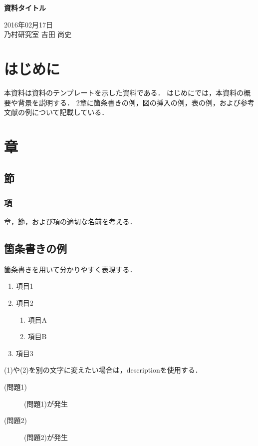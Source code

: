 \documentclass[fleqn, 14pt]{sty/extarticlej}
\begin{document}
\begin{center}
{\Large {\bf 資料タイトル}}

\end{center}
\begin{flushright}
2016年02月17日\\

乃村研究室 吉田 尚史
\end{flushright}
\section{はじめに}
本資料は資料のテンプレートを示した資料である．
はじめにでは，本資料の概要や背景を説明する．
2章に箇条書きの例，図の挿入の例，表の例，および参考文献の例について記載している．

\section{章}
\subsection{節}
\subsubsection{項}

章，節，および項の適切な名前を考える．

\subsection{箇条書きの例}
箇条書きを用いて分かりやすく表現する．
\begin{enumerate}
\item 項目1
\item 項目2
  \begin{enumerate}
  \item 項目A
  \item 項目B
  \end{enumerate}
\item 項目3
\end{enumerate}

(1)や(2)を別の文字に変えたい場合は，descriptionを使用する．
\begin{description}
\item[(問題1)] (問題1)が発生
\item[(問題2)] (問題2)が発生
\end{description}
\end{document}
